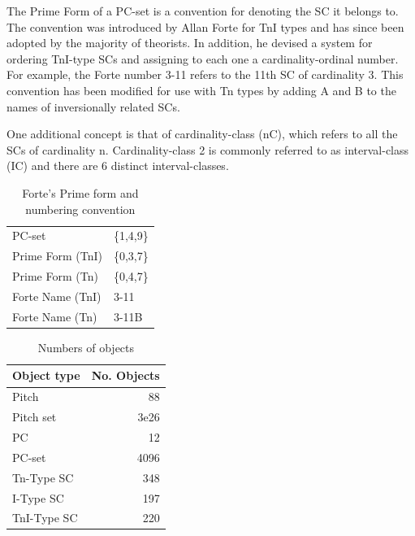 \documentclass{article}
\begin{document}
The Prime Form of a PC-set is a convention for denoting the SC it
belongs to. The convention was introduced by Allan Forte
\citep{Forte1973} for TnI types and has since been adopted by the
majority of theorists. In addition, he devised a system for ordering
TnI-type SCs and assigning to each one a cardinality-ordinal
number. For example, the Forte number 3-11 refers to the 11th SC of
cardinality 3. This convention has been modified for use with Tn types
by adding A and B to the names of inversionally related SCs.

One additional concept is that of cardinality-class (nC), which refers
to all the SCs of cardinality n. Cardinality-class 2 is commonly
referred to as interval-class (IC) and there are 6 distinct
interval-classes.
\begin{table}[htb]
\caption{Forte's Prime form and numbering convention} 
\begin{center}
\begin{tabular}{ll}
 PC-set            &  \{1,4,9\}  \\
 Prime Form (TnI)  &  \{0,3,7\}  \\
 Prime Form (Tn)   &  \{0,4,7\}  \\
 Forte Name (TnI)  &  3-11       \\
 Forte Name (Tn)   &  3-11B      \\
\end{tabular}
\end{center}
\end{table}


\begin{table}[htb]
\caption{Numbers of objects} 
\begin{center}
\begin{tabular}{lr}
 Object type  &  No. Objects  \\
\hline
 Pitch        &           88  \\
 Pitch set    &         3e26  \\
 PC           &           12  \\
 PC-set       &         4096  \\
 Tn-Type SC   &          348  \\
 I-Type SC    &          197  \\
 TnI-Type SC  &          220  \\
\end{tabular}
\end{center}
\end{table}
\end{document}
